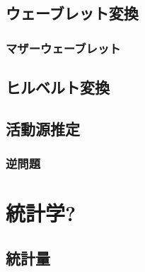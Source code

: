 \documentclass[11pt,a4paper]{jreport}
\begin{document}
\section{ウェーブレット変換}
\subsection{マザーウェーブレット}
\section{ヒルベルト変換}
\section{活動源推定}
\subsection{逆問題}

\chapter{統計学?}
\section{統計量}
\end{document}
